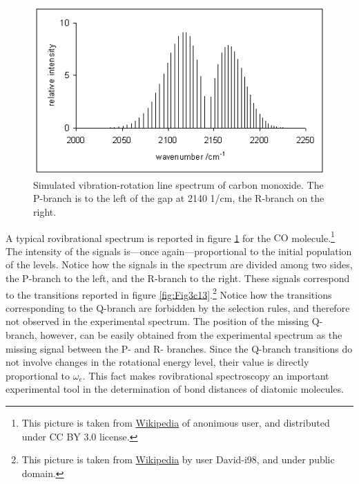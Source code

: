 \documentclass[
  9pt,
]{extbook}
\theoremstyle{definition}
\theoremstyle{definition}
\theoremstyle{definition}
\theoremstyle{remark}
\begin{document}
\begin{figure}

{\centering \includegraphics[width=0.5\linewidth]{./img/OEP_wiki6} 

}

\caption{Simulated vibration-rotation line spectrum of carbon monoxide. The P-branch is to the left of the gap at 2140 1/cm, the R-branch on the right.}\label{fig:Fig2c13}
\end{figure}

A typical rovibrational spectrum is reported in figure \ref{fig:Fig2c13} for the \(\mathrm{CO}\) molecule.\footnote{This picture is taken from \href{https://en.wikipedia.org/wiki/Rotational–vibrational_spectroscopy\#/media/File:Vib_rot_CO.png}{Wikipedia} of anonimous user, and distributed under CC BY 3.0 license.} The intensity of the signals is---once again---proportional to the initial population of the levels. Notice how the signals in the spectrum are divided among two sides, the P-branch to the left, and the R-branch to the right. These signals correspond to the transitions reported in figure \ref{fig:Fig3c13}.\footnote{This picture is taken from \href{https://en.wikipedia.org/wiki/Rotational–vibrational_spectroscopy\#/media/File:Vibrationrotationenergy.svg}{Wikipedia} by user David-i98, and under public domain.} Notice how the transitions corresponding to the Q-branch are forbidden by the selection rules, and therefore not observed in the experimental spectrum. The position of the missing Q-branch, however, can be easily obtained from the experimental spectrum as the missing signal between the P- and R- branches. Since the Q-branch transitions do not involve changes in the rotational energy level, their value is directly proportional to \(\omega_e\). This fact makes rovibrational spectroscopy an important experimental tool in the determination of bond distances of diatomic molecules.
\end{document}
